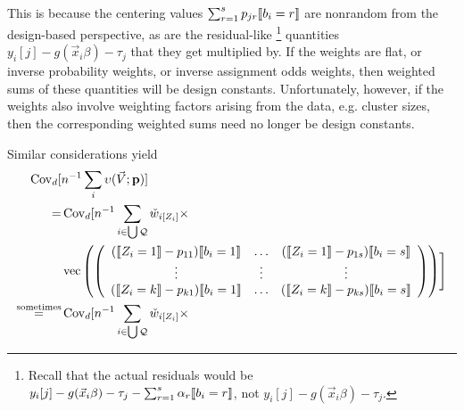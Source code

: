 \documentclass{article}
\DeclarePairedDelimiter{\indicator}{\llbracket}{\rrbracket}
\newcommand{\owt}[1][{[z_{i}]}]{\ensuremath{\check{w}_{i#1}}}
\newcommand{\absorbInterceptsEF}{\upsilon}
\begin{document}
This is because the centering values
$\sum_{r=1}^{s}p_{jr}\indicator{b_{i}=r}$ are nonrandom from the
design-based perspective, as are the residual-like%
\footnote{Recall that the actual residuals would be $y_{i}[j] -
  g(\vec{x}_{i}\beta) - \tau_{j} - \sum_{r=1}^{s}\alpha_{r}\indicator{b_{i}=r}$, not $y_{i}[j] - g(\vec{x}_{i}\beta) - \tau_{j}$.}
quantities
$y_{i}[j] - g(\vec{x}_{i}\beta) - \tau_{j}$ that they get
multiplied by.   If the weights are flat, or inverse probability
weights, or inverse assignment odds weights, then weighted sums of
these quantities will be design constants.  Unfortunately, however, if
the weights also involve weighting factors arising from the data,
e.g. cluster sizes, then the corresponding weighted sums need no
longer be design constants.

Similar considerations yield
\begin{align}
\operatorname{Cov}_{d}[
  &n^{-1}\sum_{i}\absorbInterceptsEF(\vec{V}; \mathbf{p})] \nonumber\\
  =&\operatorname{Cov}_{d}[n^{-1}
                                                 \sum_{i \in \bigcup
     \mathcal{Q}} \owt[{[Z_{i}]}] \times \nonumber \\
&  \operatorname{vec}\left(%
                                                 \left(
                                                 \begin{array}{ccc}
                                                   (\indicator{Z_{i}=1}-p_{11})\indicator{b_{i}=1}&\ldots&(\indicator{Z_{i}=1}-p_{1s})\indicator{b_{i}=s}\\
                                                   \vdots & \vdots &
                                                                     \vdots
                                                   \\
                                                   (\indicator{Z_{i}=k}-p_{k1})\indicator{b_{i}=1}&\ldots&(\indicator{Z_{i}=k}-p_{ks})\indicator{b_{i}=s}\\
                                                 \end{array}
  \right)%
  \right)
  \Biggr] \nonumber \\
  \stackrel{\text{sometimes}}{=}&\operatorname{Cov}_{d}[n^{-1}
                                                 \sum_{i \in \bigcup
     \mathcal{Q}} \owt[{[Z_{i}]}] \times \nonumber \\

\end{align}
\end{document}
